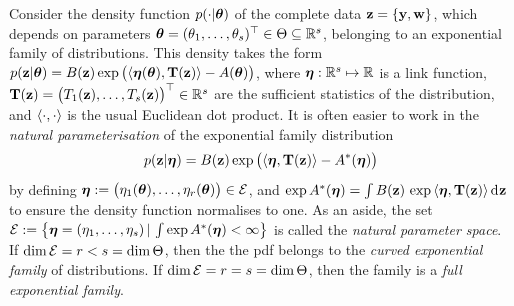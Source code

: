 Consider the density function $p(\cdot|{\bm\theta})$ of the complete data ${\mathbf z} = \{{\mathbf y},{\mathbf w}\}$, which depends on parameters ${\bm\theta} = (\theta_1,\dots,\theta_s)^\top \in\Theta\subseteq\mathbb{R}^s$, belonging to an exponential family of distributions.
This density takes the form $p({\mathbf z}|{\bm\theta}) = B({\mathbf z}) \exp \big( \langle{\bm\eta}({\bm\theta}), {\mathbf T}({\mathbf z})\rangle -  A({\bm\theta}) \big)$, where ${\bm\eta}:\mathbb{R}^s \mapsto \mathbb{R}$ is a link function,  ${\mathbf T}({\mathbf z}) = \big(T_1({\mathbf z}),\dots,T_s({\mathbf z})\big)^\top \in \mathbb{R}^s$ are the sufficient statistics of the distribution, and $\langle\cdot,\cdot\rangle$ is the usual Euclidean dot product.
It is often easier to work in the \emph{natural parameterisation} of the exponential family distribution
\begin{align}\label{eq:pdfexpfamnat}
  p({\mathbf z}|{\bm\eta}) = B({\mathbf z}) \exp \big( \langle{\bm\eta}, {\mathbf T}({\mathbf z})\rangle -  A^*({\bm\eta}) \big)
\end{align}
by defining ${\bm\eta} := \big(\eta_1({\bm\theta}),\dots,\eta_r({\bm\theta})\big) \in {\mathcal E}$, and $\exp A^*({\bm\eta}) = \int B({\mathbf z}) \, \exp \, \langle{\bm\eta}, {\mathbf T}({\mathbf z})\rangle  \operatorname{d}\hspace{0.5pt}\! {\mathbf z}$ to ensure the density function normalises to one.
As an aside, the set ${\mathcal E} := \big\{ {\bm\eta} = (\eta_1,\dots,\eta_s) \,|\, \int  \exp A^*({\bm\eta}) < \infty \big\}$ is called the \emph{natural parameter space}.
If $\dim {\mathcal E} = r < s = \dim \Theta$, then the the pdf belongs to the \emph{curved exponential family} of distributions.
If $\dim {\mathcal E} = r = s = \dim \Theta$, then the family is a \emph{full exponential family}.

